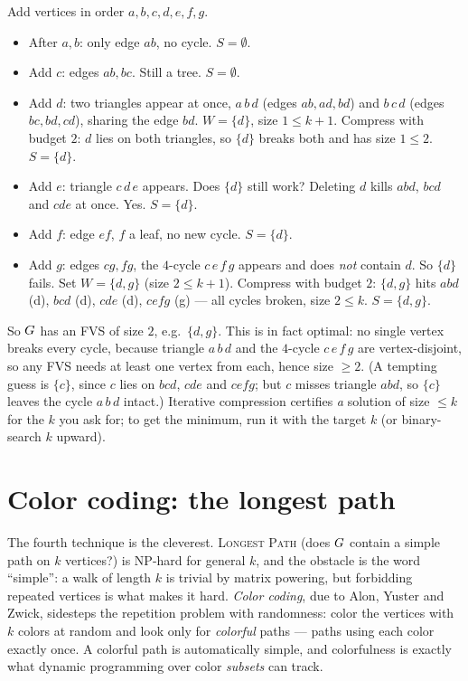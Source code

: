\begin{labbox}
Add vertices in order $a,b,c,d,e,f,g$.
\begin{itemize}
  \item After $a,b$: only edge $ab$, no cycle. $S=\emptyset$.
  \item Add $c$: edges $ab,bc$. Still a tree. $S=\emptyset$.
  \item Add $d$: two triangles appear at once, $a\,b\,d$ (edges $ab,ad,bd$) and $b\,c\,d$ (edges $bc,bd,cd$), sharing the edge $bd$. $W=\{d\}$, size $1\le k+1$. Compress with budget $2$: $d$ lies on both triangles, so $\{d\}$ breaks both and has size $1\le 2$. $S=\{d\}$.
  \item Add $e$: triangle $c\,d\,e$ appears. Does $\{d\}$ still work? Deleting $d$ kills $abd$, $bcd$ and $cde$ at once. Yes. $S=\{d\}$.
  \item Add $f$: edge $ef$, $f$ a leaf, no new cycle. $S=\{d\}$.
  \item Add $g$: edges $cg,fg$, the $4$-cycle $c\,e\,f\,g$ appears and does \emph{not} contain $d$. So $\{d\}$ fails. Set $W=\{d,g\}$ (size $2\le k+1$). Compress with budget $2$: $\{d,g\}$ hits $abd$ (d), $bcd$ (d), $cde$ (d), $cefg$ (g) --- all cycles broken, size $2\le k$. $S=\{d,g\}$.
\end{itemize}
So $G$ has an FVS of size $2$, e.g.\ $\{d,g\}$. This is in fact optimal: no single vertex breaks every cycle, because triangle $a\,b\,d$ and the $4$-cycle $c\,e\,f\,g$ are vertex-disjoint, so any FVS needs at least one vertex from each, hence size $\ge 2$. (A tempting guess is $\{c\}$, since $c$ lies on $bcd$, $cde$ and $cefg$; but $c$ misses triangle $abd$, so $\{c\}$ leaves the cycle $a\,b\,d$ intact.) Iterative compression certifies \emph{a} solution of size $\le k$ for the $k$ you ask for; to get the minimum, run it with the target $k$ (or binary-search $k$ upward).
\end{labbox}

\section{Color coding: the longest path}

The fourth technique is the cleverest. \textsc{Longest Path} (does $G$ contain a simple path on $k$ vertices?) is NP-hard for general $k$, and the obstacle is the word ``simple'': a walk of length $k$ is trivial by matrix powering, but forbidding repeated vertices is what makes it hard. \emph{Color coding}, due to Alon, Yuster and Zwick, sidesteps the repetition problem with randomness: color the vertices with $k$ colors at random and look only for \emph{colorful} paths --- paths using each color exactly once. A colorful path is automatically simple, and colorfulness is exactly what dynamic programming over color \emph{subsets} can track.

